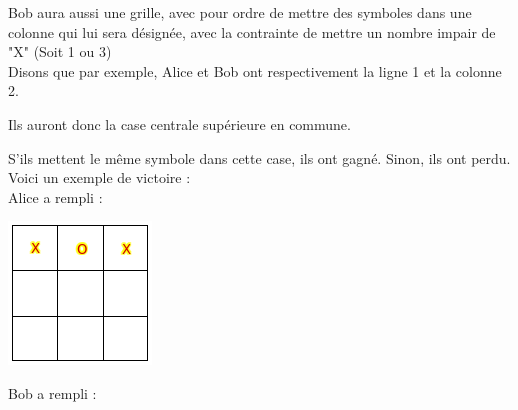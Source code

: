 \documentclass[11pt]{article}
\begin{document}
\noindent Bob aura aussi une grille, avec pour ordre de mettre des symboles dans une colonne qui lui sera désignée, avec la contrainte de mettre un nombre impair de "X" (Soit 1 ou 3)
\\

\noindent Disons que par exemple, Alice et Bob ont respectivement la ligne 1 et la colonne 2.

\noindent Ils auront donc la case centrale supérieure en commune.

\noindent S'ils mettent le même symbole dans cette case, ils ont gagné. Sinon, ils ont perdu.
\\
\newpage
\noindent Voici un exemple de victoire :
\\

\noindent Alice a rempli :


\includegraphics[width=\textwidth]{gridalice.png}

\newpage
\noindent Bob a rempli :
\end{document}
